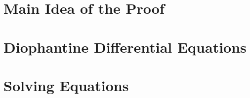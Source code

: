 \documentclass[twoside,letterpaper,10pt]{article}
\begin{document}
\section{Main Idea of the Proof}
\label{sec:main-idea-proof}

\section{Diophantine Differential Equations}
\label{sec:dioph-diff-equat}

\section{Solving Equations}
\label{sec:solving-equations}
\end{document}
